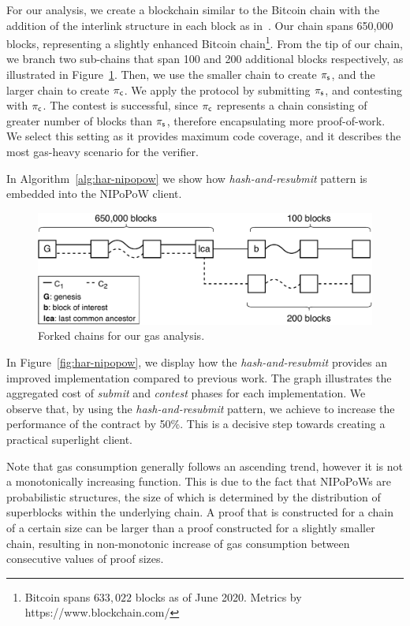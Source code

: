 For our analysis, we create a blockchain similar to the Bitcoin chain with the
addition of the interlink structure in each block as in~\cite{gglou}. Our chain
spans 650,000 blocks, representing a slightly enhanced Bitcoin
chain\footnote{Bitcoin spans $633{,}022$ blocks as of June 2020. Metrics by
https://www.blockchain.com/}. From the tip of our chain, we branch two
sub-chains that span 100 and 200 additional blocks respectively, as illustrated
in Figure~\ref{fig:chains}. Then, we use the smaller chain to create $\mathsf{\pi_{s}}$,
and the larger chain to create $\mathsf{\pi_{c}}$. We apply the protocol by submitting
$\mathsf{\pi_{s}}$, and contesting with $\mathsf{\pi_{c}}$. The contest is successful, since $\mathsf{\pi_{c}}$
represents a chain consisting of greater number of blocks than $\mathsf{\pi_{s}}$,
therefore encapsulating more proof-of-work. We select this setting as it
provides maximum code coverage, and it describes the most gas-heavy scenario
for the verifier.

In Algorithm~\ref{alg:har-nipopow} we show how \emph{hash-and-resubmit} pattern
is embedded into the NIPoPoW client.

\begin{figure}[!h]
    \begin{center}
        \includegraphics[width=0.6\columnwidth]{figures/nipopow-subm-cont}
    \end{center}
    \caption{Forked chains for our gas analysis.}
    \label{fig:chains}
\end{figure}

In Figure~\ref{fig:har-nipopow}, we display how the \emph{hash-and-resubmit}
provides an improved implementation compared to previous work. The graph
illustrates the aggregated cost of \emph{submit} and \emph{contest} phases for
each implementation. We observe that, by using the \emph{hash-and-resubmit}
pattern, we achieve to increase the performance of the contract by 50\%. This
is a decisive step towards creating a practical superlight client.

Note that gas consumption generally follows an ascending trend, however it
is not a monotonically increasing function. This is due to the fact that
NIPoPoWs are probabilistic structures, the size of which is determined by the
distribution of superblocks within the underlying chain. A proof that is
constructed for a chain of a certain size can be larger than a proof
constructed for a slightly smaller chain, resulting in non-monotonic increase
of gas consumption between consecutive values of proof sizes.

